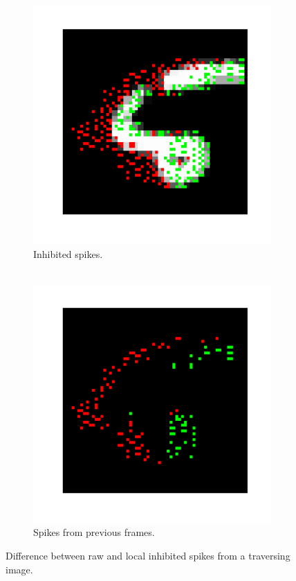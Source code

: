\documentclass[conference]{IEEEtran}
\begin{document}
\begin{figure}[hbt]
\begin{subfigure}[b]{0.155\textwidth}
    \includegraphics[width=\textwidth,trim={3cm 2cm 2cm 2cm},clip] {inhibitory_behaviour__INHIBITED___cycle_00000___frame_00035_}
    \caption{Inhibited spikes.\\~}
    \label{fig:post_inh}
  \end{subfigure}
  \begin{subfigure}[b]{0.155\textwidth}
    \includegraphics[width=\textwidth,trim={3cm 2cm 2cm 2cm},clip] {inhibitory_behaviour__DIFF___cycle_00000___frame_00035_}
    \caption{Spikes from previous frames.}
    \label{fig:diff_post_inh}
  \end{subfigure}
  \caption[Difference between raw and local inhibited spikes from a traversing image.]{Difference between raw and local inhibited spikes from a traversing image.}
  \label{fig:inh_diff}
\end{figure}
\end{document}
